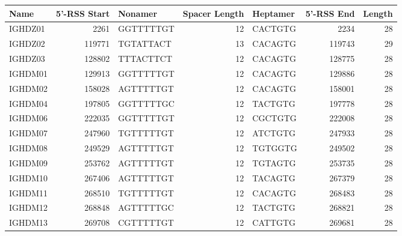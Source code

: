\begin{tabular}{lrlrlrr}
  \toprule Name & 5'-RSS Start & Nonamer & Spacer Length & Heptamer & 5'-RSS End & Length \\ 
  \midrule IGHDZ01 & 2261 & GGTTTTTGT & 12 & CACTGTG & 2234 & 28 \\ 
  IGHDZ02 & 119771 & TGTATTACT & 13 & CACAGTG & 119743 & 29 \\ 
  IGHDZ03 & 128802 & TTTACTTCT & 12 & CACAGTG & 128775 & 28 \\ 
  IGHDM01 & 129913 & GGTTTTTGT & 12 & CACAGTG & 129886 & 28 \\ 
  IGHDM02 & 158028 & AGTTTTTGT & 12 & CACAGTG & 158001 & 28 \\ 
  IGHDM04 & 197805 & GGTTTTTGC & 12 & TACTGTG & 197778 & 28 \\ 
  IGHDM06 & 222035 & GGTTTTTGT & 12 & CGCTGTG & 222008 & 28 \\ 
  IGHDM07 & 247960 & TGTTTTTGT & 12 & ATCTGTG & 247933 & 28 \\ 
  IGHDM08 & 249529 & AGTTTTTGT & 12 & TGTGGTG & 249502 & 28 \\ 
  IGHDM09 & 253762 & AGTTTTTGT & 12 & TGTAGTG & 253735 & 28 \\ 
  IGHDM10 & 267406 & AGTTTTTGT & 12 & TACAGTG & 267379 & 28 \\ 
  IGHDM11 & 268510 & TGTTTTTGT & 12 & CACAGTG & 268483 & 28 \\ 
  IGHDM12 & 268848 & AGTTTTTGC & 12 & TACTGTG & 268821 & 28 \\ 
  IGHDM13 & 269708 & CGTTTTTGT & 12 & CATTGTG & 269681 & 28 \\ 
   \bottomrule \end{tabular}

